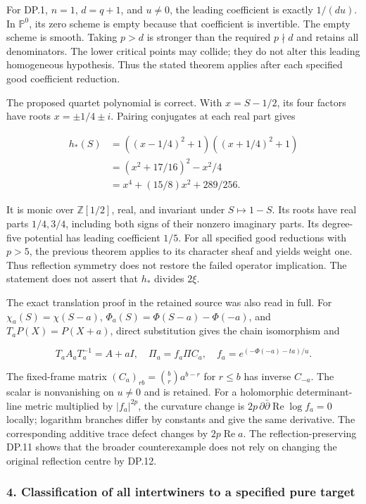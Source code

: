 \documentclass{article}
\begin{document}
For DP.1, \(n=1\), \(d=q+1\), and \(u\ne0\), the leading coefficient is exactly \(1/(du)\). In \(\mathbb P^0\), its zero scheme is empty because that coefficient is invertible. The empty scheme is smooth. Taking \(p>d\) is stronger than the required \(p\nmid d\) and retains all denominators. The lower critical points may collide; they do not alter this leading homogeneous hypothesis. Thus the stated theorem applies after each specified good coefficient reduction.

The proposed quartet polynomial is correct. With \(x=S-1/2\), its four factors have roots \(x=\pm1/4\pm i\). Pairing conjugates at each real part gives

\[
\begin{aligned}
h_*(S)
&=((x-1/4)^2+1)((x+1/4)^2+1)\\
&=(x^2+17/16)^2-x^2/4\\
&=x^4+(15/8)x^2+289/256.
\end{aligned}
\tag{DP.11}
\]

It is monic over \(\mathbb Z[1/2]\), real, and invariant under \(S\mapsto1-S\). Its roots have real parts \(1/4,3/4\), including both signs of their nonzero imaginary parts. Its degree-five potential has leading coefficient \(1/5\). For all specified good reductions with \(p>5\), the previous theorem applies to its character sheaf and yields weight one. Thus reflection symmetry does not restore the failed operator implication. The statement does not assert that \(h_*\) divides \(2\xi\).

The exact translation proof in the retained source was also read in full. For \(\chi_a(S)=\chi(S-a)\), \(\Phi_a(S)=\Phi(S-a)-\Phi(-a)\), and \(T_aP(X)=P(X+a)\), direct substitution gives the chain isomorphism and

\[
T_aA_aT_a^{-1}=A+aI,
\quad \Pi_a=f_a\Pi C_a,
\quad f_a=e^{(-\Phi(-a)-ta)/u}.
\tag{DP.12}
\]

The fixed-frame matrix \((C_a)_{rb}=\binom br a^{b-r}\) for \(r\le b\) has inverse \(C_{-a}\). The scalar is nonvanishing on \(u\ne0\) and is retained. For a holomorphic determinant-line metric multiplied by \(|f_a|^{2p}\), the curvature change is \(2p\,\partial\bar\partial\operatorname{Re}\log f_a=0\) locally; logarithm branches differ by constants and give the same derivative. The corresponding additive trace defect changes by \(2p\operatorname{Re}a\). The reflection-preserving DP.11 shows that the broader counterexample does not rely on changing the original reflection centre by DP.12.

\subsubsection{4. Classification of all intertwiners to a specified pure target}\label{endpoint-purity_review--classification-of-all-intertwiners-to-a-specified-pure-target}
\end{document}
